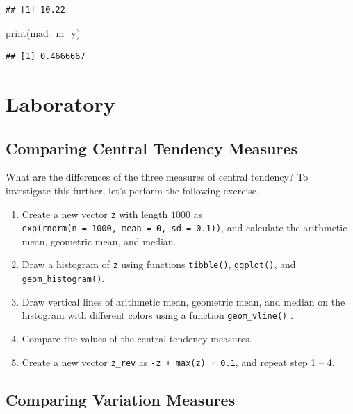 \documentclass[
]{book}
\newenvironment{Shaded}{\begin{snugshade}}{\end{snugshade}}
\newcommand{\FunctionTok}[1]{\textcolor[rgb]{0.00,0.00,0.00}{#1}}
\newcommand{\NormalTok}[1]{#1}
\begin{document}
\begin{verbatim}
## [1] 10.22
\end{verbatim}

\begin{Shaded}
\begin{Highlighting}[]
\FunctionTok{print}\NormalTok{(mad\_m\_y)}
\end{Highlighting}
\end{Shaded}

\begin{verbatim}
## [1] 0.4666667
\end{verbatim}

\hypertarget{laboratory}{%
\section{Laboratory}\label{laboratory}}

\hypertarget{comparing-central-tendency-measures}{%
\subsection{Comparing Central Tendency Measures}\label{comparing-central-tendency-measures}}

What are the differences of the three measures of central tendency? To investigate this further, let's perform the following exercise.

\begin{enumerate}
\def\labelenumi{\arabic{enumi}.}
\item
  Create a new vector \texttt{z} with length \(1000\) as \texttt{exp(rnorm(n\ =\ 1000,\ mean\ =\ 0,\ sd\ =\ 0.1))}, and calculate the arithmetic mean, geometric mean, and median.
\item
  Draw a histogram of \texttt{z} using functions \texttt{tibble()}, \texttt{ggplot()}, and \texttt{geom\_histogram()}.
\item
  Draw vertical lines of arithmetic mean, geometric mean, and median on the histogram with different colors using a function \texttt{geom\_vline()} .
\item
  Compare the values of the central tendency measures.
\item
  Create a new vector \texttt{z\_rev} as \texttt{-z\ +\ max(z)\ +\ 0.1}, and repeat step 1 -- 4.
\end{enumerate}

\hypertarget{comparing-variation-measures}{%
\subsection{Comparing Variation Measures}\label{comparing-variation-measures}}
\end{document}
